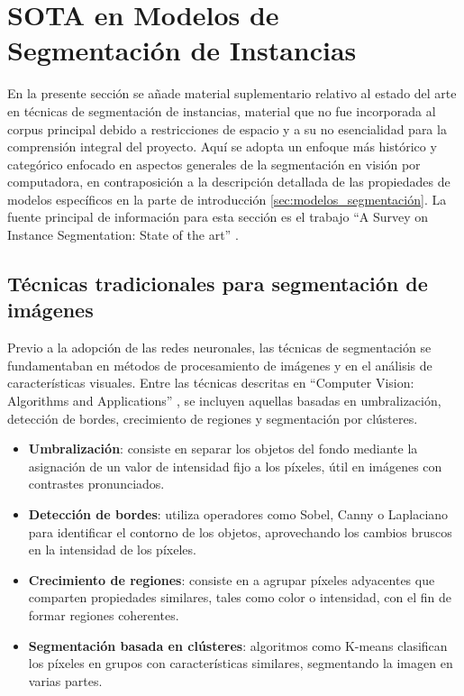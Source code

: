 \label{part:anexo}
\section{SOTA en Modelos de Segmentación de Instancias}
\label{sec:anexo_sota_segmentacion}
En la presente sección se añade material suplementario relativo al estado del arte en técnicas de segmentación de instancias, material que no fue incorporada al corpus principal debido a restricciones de espacio y a su no esencialidad para la comprensión integral del proyecto. Aquí se adopta un enfoque más histórico y categórico enfocado en aspectos generales de la segmentación en visión por computadora, en contraposición a la descripción detallada de las propiedades de modelos específicos en la parte de introducción \ref{sec:modelos_segmentación}. La fuente principal de información para esta sección es el trabajo \enquote{A Survey on Instance Segmentation: State of the art} \cite[Hafiz y Bhat 2020]{Hafiz2020}.

\subsection{Técnicas tradicionales para segmentación de imágenes}
Previo a la adopción de las redes neuronales, las técnicas de segmentación se fundamentaban en métodos de procesamiento de imágenes y en el análisis de características visuales. Entre las técnicas descritas en \enquote{Computer Vision: Algorithms and Applications} \cite[Szeliski 2022]{Szeliski2022}, se incluyen aquellas basadas en umbralización, detección de bordes, crecimiento de regiones y segmentación por clústeres.

\begin{itemize}
\setlength\itemsep{-0.3em}
    \item \textbf{Umbralización}: consiste en separar los objetos del fondo mediante la asignación de un valor de intensidad fijo a los píxeles, útil en imágenes con contrastes pronunciados.
    \item \textbf{Detección de bordes}: utiliza operadores como Sobel, Canny o Laplaciano para identificar el contorno de los objetos, aprovechando los cambios bruscos en la intensidad de los píxeles.
    \item \textbf{Crecimiento de regiones}: consiste en a agrupar píxeles adyacentes que comparten propiedades similares, tales como color o intensidad, con el fin de formar regiones coherentes.
    \item \textbf{Segmentación basada en clústeres}: algoritmos como K-means clasifican los píxeles en grupos con características similares, segmentando la imagen en varias partes.
\end{itemize}

